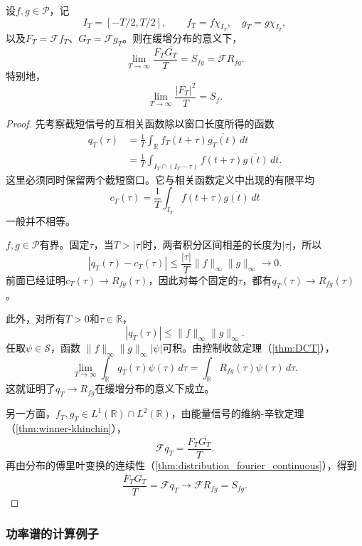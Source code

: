 \begin{theorem}\label{thm:power_winner_khinchin}
    设$f,g\in\mathcal{P}$，记
    $$
        I_T=[-T/2,T/2],\qquad
        f_T=f\chi_{I_T},\quad g_T=g\chi_{I_T},
    $$
    以及$F_T=\mathcal{F}f_T$、$G_T=\mathcal{F}g_T$。则在缓增分布的意义下，
    $$
        \lim_{T\to\infty}\frac{F_T\overline{G_T}}{T}
        =S_{fg}=\mathcal{F}R_{fg}.
    $$
    特别地，
    $$
        \lim_{T\to\infty}\frac{|F_T|^2}{T}=S_f.
    $$
\end{theorem}
\begin{proof}
    先考察截短信号的互相关函数除以窗口长度所得的函数
    \begin{align*}
        q_T(\tau)
         & =\frac1T\int_{\mathbb{R}}
        f_T(t+\tau)\overline{g_T(t)}\,dt    \\
         & =\frac1T\int_{I_T\cap(I_T-\tau)}
        f(t+\tau)\overline{g(t)}\,dt.
    \end{align*}
    这里必须同时保留两个截短窗口。它与相关函数定义中出现的有限平均
    $$
        c_T(\tau)=\frac1T\int_{I_T}
        f(t+\tau)\overline{g(t)}\,dt
    $$
    一般并不相等。

    $f,g\in\mathcal{P}$有界。固定$\tau$，当$T>|\tau|$时，两者积分区间相差的长度为$|\tau|$，所以
    $$
        |q_T(\tau)-c_T(\tau)|
        \le\frac{|\tau|}{T}\|f\|_\infty\|g\|_\infty
        \longrightarrow0.
    $$
    前面已经证明$c_T(\tau)\to R_{fg}(\tau)$，因此对每个固定的$\tau$，都有$q_T(\tau)\to R_{fg}(\tau)$。

    此外，对所有$T>0$和$\tau\in\mathbb{R}$，
    $$
        |q_T(\tau)|\le\|f\|_\infty\|g\|_\infty.
    $$
    任取$\psi\in\mathcal{S}$，函数
    $\|f\|_\infty\|g\|_\infty|\psi|$可积。由控制收敛定理（\cref{thm:DCT}），
    $$
        \lim_{T\to\infty}\int_{\mathbb{R}}q_T(\tau)\psi(\tau)\,d\tau
        =\int_{\mathbb{R}}R_{fg}(\tau)\psi(\tau)\,d\tau.
    $$
    这就证明了$q_T\to R_{fg}$在缓增分布的意义下成立。

    另一方面，$f_T,g_T\in L^1(\mathbb{R})\cap L^2(\mathbb{R})$，由能量信号的维纳-辛钦定理（\cref{thm:winner-khinchin}），
    $$
        \mathcal{F}q_T=\frac{F_T\overline{G_T}}{T}.
    $$
    再由分布的傅里叶变换的连续性（\cref{thm:distribution_fourier_continuous}），得到
    $$
        \frac{F_T\overline{G_T}}{T}
        =\mathcal{F}q_T
        \longrightarrow\mathcal{F}R_{fg}=S_{fg}.
    $$
\end{proof}

\subsubsection{功率谱的计算例子}

